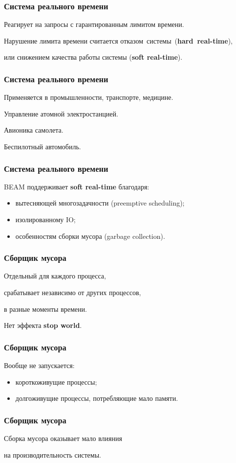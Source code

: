 \documentclass[10pt]{beamer}
\begin{document}
\begin{frame}
  \frametitle{Система реального времени}
  Реагирует на запросы с гарантированным лимитом времени.
  \par \bigskip
  Нарушение лимита времени считается отказом~системы~(\textbf{hard~real-time}),
  \par \bigskip
  или снижением качества работы системы (\textbf{soft real-time}).
\end{frame}

\begin{frame}
  \frametitle{Система реального времени}
  Применяется в промышленности, транспорте, медицине.
  \par \bigskip
  Управление атомной электростанцией.
  \par \bigskip
  Авионика самолета.
  \par \bigskip
  Беспилотный автомобиль.
\end{frame}

\begin{frame}
  \frametitle{Система реального времени}
  BEAM поддерживает \textbf{soft real-time} благодаря:
  \begin{itemize}
  \item вытесняющей многозадачности (preemptive scheduling);
  \item изолированному IO;
  \item особенностям сборки мусора (garbage collection).
  \end{itemize}
\end{frame}

\begin{frame}
  \frametitle{Сборщик мусора}
  Отдельный для каждого процесса,
  \par \bigskip
  срабатывает независимо от других процессов,
  \par \bigskip
  в разные моменты времени.
  \par \bigskip
  Нет эффекта \textbf{stop world}.
\end{frame}

\begin{frame}
  \frametitle{Сборщик мусора}
  Вообще не запускается:
  \begin{itemize}
  \item короткоживущие процессы;
  \item долгоживущие процессы, потребляющие мало памяти.
  \end{itemize}
\end{frame}

\begin{frame}
  \frametitle{Сборщик мусора}
  Сборка мусора оказывает мало влияния
  \par \bigskip
  на производительность системы.
\end{frame}
\end{document}
